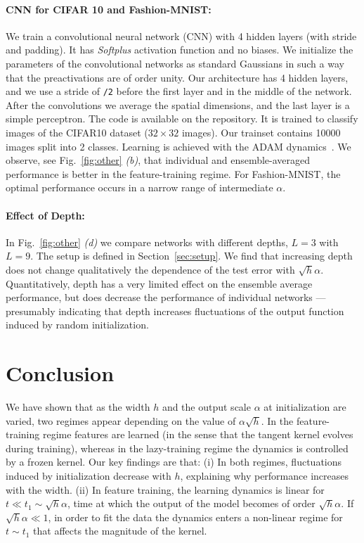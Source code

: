 \documentclass{article}
\newcommand{\mm}[1]{\textcolor{black}{#1}}
\renewcommand{\cite}[1]{\citep{#1}}
\newcommand{\sref}[1]{Section~\ref{#1}}
\newcommand{\fref}[1]{Fig.~\ref{#1}}
\begin{document}
\paragraph{CNN for CIFAR 10 and Fashion-MNIST:}
We train a convolutional neural network (CNN) with 4 hidden layers (with stride and padding). It has \textit{Softplus} activation function and no biases. We initialize the parameters of the convolutional networks as standard Gaussians in such a way that the preactivations are of order unity.
Our architecture has 4 hidden layers, and we use a stride of \texttt{/2} before the first layer and in the middle of the network. After the convolutions we average the spatial dimensions, and the last layer is a simple perceptron. The code is available on the repository. It is trained to classify images of the CIFAR10 dataset ($32\times32$ images). Our trainset contains 10000 images split into 2 classes. Learning is achieved with the ADAM dynamics~\cite{Kingma14}.
We observe, see \fref{fig:other} \emph{(b)}, that individual and ensemble-averaged performance is better in the feature-training regime. For Fashion-MNIST, the optimal performance  occurs in a narrow range of intermediate $\alpha$.

\paragraph{Effect of Depth:}
In \fref{fig:other} \emph{(d)} we compare networks with different depths, $L=3$ with $L=9$. The setup is defined in \sref{sec:setup}.
We find that increasing depth does not change qualitatively the dependence of the test error with $\sqrt{h}\alpha$. Quantitatively, depth has a very limited effect on the ensemble average performance, but does decrease the performance of individual networks --- presumably indicating that depth increases fluctuations of the output function induced by random initialization.

\section{Conclusion}

We have shown that as the width $h$ and the output scale $\alpha$ at initialization are varied, two regimes appear depending on the value of $\alpha\sqrt{h}$. In the feature-training regime features are learned (in the sense that the tangent kernel evolves during training), whereas in the lazy-training regime the dynamics is controlled by a frozen kernel. Our key findings are that: (i) In both regimes, fluctuations induced by initialization decrease with $h$, explaining why performance increases with the width. (ii) In feature training, the learning dynamics is linear for $t \ll t_1 \sim \sqrt{h}\alpha$, time at which the output of the model becomes of order $\sqrt{h}\alpha$. If $\sqrt{h}\alpha \ll 1$, in order to fit the data the dynamics enters a non-linear regime for $t \sim t_1$ that affects the magnitude of the kernel.
\end{document}

